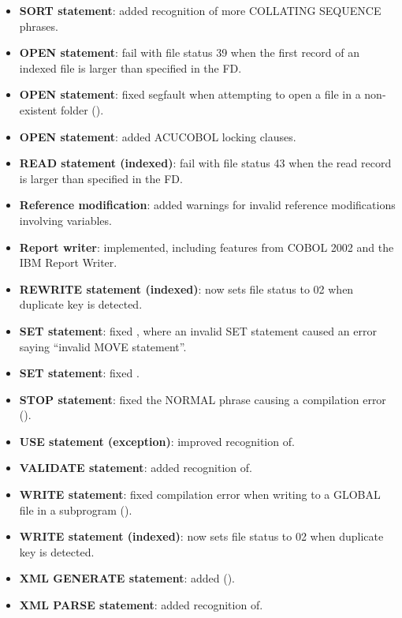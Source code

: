 \begin{itemize}
\item \textbf{SORT statement}: added recognition of more COLLATING SEQUENCE phrases.
\item \textbf{OPEN statement}: fail with file status 39 when the first record of an indexed file is larger than specified in the FD.
\item \textbf{OPEN statement}: fixed segfault when attempting to open a file in a non-existent folder ().
\item \textbf{OPEN statement}: added ACUCOBOL locking clauses.
\item \textbf{READ statement (indexed)}: fail with file status 43 when the read record is larger than specified in the FD.
\item \textbf{Reference modification}: added warnings for invalid reference modifications involving variables.
\item \textbf{Report writer}: implemented, including features from COBOL 2002 and the IBM Report Writer.
\item \textbf{REWRITE statement (indexed)}: now sets file status to 02 when duplicate key is detected.
\item \textbf{SET statement}: fixed , where an invalid SET statement caused an error saying ``invalid MOVE statement''.
\item \textbf{SET statement}: fixed .
\item \textbf{STOP statement}: fixed the NORMAL phrase causing a compilation error ().
\item \textbf{USE statement (exception)}: improved recognition of.
\item \textbf{VALIDATE statement}: added recognition of.
\item \textbf{WRITE statement}: fixed compilation error when writing to a GLOBAL file in a subprogram ().
\item \textbf{WRITE statement (indexed)}: now sets file status to 02 when duplicate key is detected.
\item \textbf{XML GENERATE statement}: added ().
\item \textbf{XML PARSE statement}: added recognition of.
\end{itemize}

